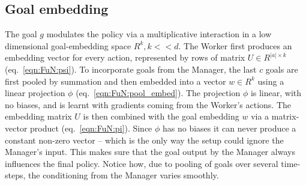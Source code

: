 

\subsection{Goal embedding}
\label{subsec:goal_embedding}
The goal $g$ modulates the policy via a multiplicative interaction in a low dimensional goal-embedding space $R^k, k<<d$. The Worker first produces an embedding vector for every action, represented by rows of matrix $U \in R^{|a| \times k}$ (eq.~\ref{eqn:FuN:psi}). 
To incorporate goals from the Manager, the last $c$ goals are first pooled by summation and then embedded into a vector $w \in R^k$ using a linear projection $\phi$ (eq.~\ref{eqn:FuN:pool_embed}). The projection $\phi$ is linear, with no biases, and is learnt with gradients coming from the Worker's actions. The embedding matrix $U$ is then combined with the goal embedding $w$ via a matrix-vector product (eq.~\ref{eqn:FuN:pi}).
Since $\phi$ has no biases it can never produce a constant non-zero vector  -- which is the only way the setup could ignore the Manager's input. This makes sure that the goal output by the Manager always influences the final policy. Notice how, due to pooling of goals over several time-steps, the conditioning from the Manager varies smoothly. 



